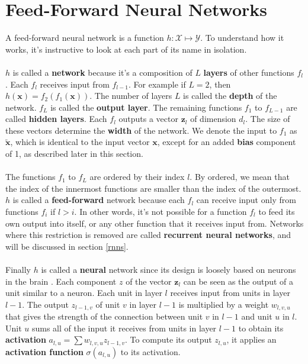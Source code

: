 \section{Feed-Forward Neural Networks}
A feed-forward neural network is a function $h: \mathcal{X} \mapsto \mathcal{Y}$. To understand how it works, it's instructive to look at each part of its name in isolation.
\\\\
$h$ is called a \textbf{network} because it's a composition of $L$ \textbf{layers} of other functions $f_l$. Each $f_l$ receives input from $f_{l-1}$. For example if $L = 2$, then $h(\mathbf{x}) = f_2(f_1(\mathbf{x}))$. The number of layers $L$ is called the \textbf{depth} of the network. $f_L$ is called the \textbf{output layer}. The remaining functions $f_1$ to $f_{L-1}$ are called \textbf{hidden layers}. Each $f_l$ outputs a vector $\mathbf{z}_l$ of dimension $d_l$. The size of these vectors determine the \textbf{width} of the network. We denote the input to $f_1$ as $\tilde{\mathbf{x}}$, which is identical to the input vector $\mathbf{x}$, except for an added \textbf{bias} component of 1, as described later in this section.
\\\\
The functions $f_1$ to $f_L$ are ordered by their index $l$. By ordered, we mean that the index of the innermost functions are smaller than the index of the outermost. $h$ is called a \textbf{feed-forward} network because each $f_l$ can receive input only from functions $f_i$ if $l > i$. In other words, it's not possible for a function $f_l$ to feed its own output into itself, or any other function that it receives input from. Networks where this restriction is removed are called \textbf{recurrent neural networks}, and will be discussed in section \ref{rnns}.
\\\\
Finally $h$ is called a \textbf{neural} network since its design is loosely based on neurons in the brain \citep{goodfellow16}. Each component $z$ of the vector $\mathbf{z}_l$ can be seen as the output of a unit similar to a neuron. Each unit in layer $l$ receives input from units in layer $l-1$. The output $z_{l-1,v}$ of unit $v$ in layer $l-1$ is multiplied by a weight $w_{l,v,u}$ that gives the strength of the connection between unit $v$ in $l-1$ and unit $u$ in $l$. Unit $u$ sums all of the input it receives from units in layer $l-1$ to obtain its \textbf{activation} $a_{l,u} = \sum w_{l,v,u}z_{l-1,v}$. To compute its output $z_{l,u}$, it applies an \textbf{activation function} $\sigma(a_{l,u})$ to its activation.

